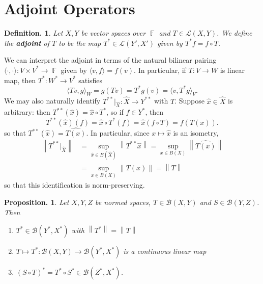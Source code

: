\documentclass[11pt, a4paper]{memoir}
\DeclareMathOperator{\F}{{\mathbb{F}}}
\newcommand{\norm}[1]{\ensuremath{\left\lVert#1\right\rVert}}
\theoremstyle{change}
\newtheorem{proposition}[theorem]{Proposition.}
\theoremstyle{plain}
\theoremstyle{nonumberplain}
\newtheorem{definition}{Definition.}
\numberwithin{equation}{section}
\begin{document}
\section{Adjoint Operators}
\begin{definition}
    Let $X,Y$ be vector spaces over $\F$ and $T\in\mathcal{L}(X,Y)$.
    We define the \textbf{adjoint} of $T$ to be the map $T^*\in\mathcal{L}(Y',X')$ given by $T^*f=f\circ T$.
\end{definition}
We can interpret the adjoint in terms of the natural bilinear pairing $\langle\cdot,\cdot\rangle:V\times V^*\to\F$ given by $\langle v,f\rangle=f(v)$.
In particular, if $T:V\to W$ is linear map, then $T^*:W^*\to V^*$ satisfies
\begin{equation*}
    \langle Tv,g\rangle_{W} = g(Tv) = T^*g(v)= \langle v,T^*g\rangle_V.
\end{equation*}
We may also naturally identify $T^{**}|_{\hat{X}}:\hat{X}\to Y^{**}$ with $T$.
Suppose $\hat{x}\in\hat{X}$ is arbitrary: then $T^{**}(\hat{x})=\hat{x}\circ T^*$, so if $f\in Y^*$, then
\begin{equation*}
    T^{**}(\hat{x})(f)=\hat{x}\circ T^*(f)=\hat{x}(f\circ T)=f(T(x)).
\end{equation*}
so that $T^{**}(\hat{x})=\widehat{T(x)}$.
In particular, since $x\mapsto\hat{x}$ is an isometry,
\begin{align*}
    \norm{T^{**}|_{\hat{X}}} &= \sup_{\hat{x}\in B(\hat{X})}\norm{T^{**}\hat{x}} = \sup_{x\in B(X)}\norm{\widehat{T(x)}}\\
                             &= \sup_{x\in B(X)}\norm{T(x)}= \norm{T}
\end{align*}
so that this identification is norm-preserving.
\begin{proposition}
    Let $X,Y,Z$ be normed spaces, $T\in\mathcal{B}(X,Y)$ and $S\in\mathcal{B}(Y,Z)$.
    Then
    \begin{enumerate}[nl,r]
        \item $T^*\in\mathcal{B}(Y^*,X^*)$ with $\norm{T^*}=\norm{T}$
        \item $T\mapsto T^*:\mathcal{B}(X,Y)\to\mathcal{B}(Y^*,X^*)$ is a continuous linear map
        \item $(S\circ T)^*=T^*\circ S^*\in\mathcal{B}(Z^*,X^*)$.
    \end{enumerate}
\end{proposition}
\end{document}
